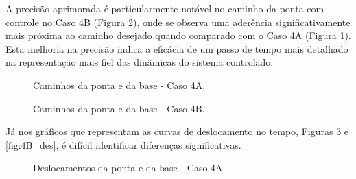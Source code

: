 A precisão aprimorada é particularmente notável no caminho da ponta com controle no Caso 4B (Figura \ref{fig:4B_cam}), onde se observa uma aderência significativamente mais próxima ao caminho desejado quando comparado com o Caso 4A (Figura \ref{fig:4A_cam}). Esta melhoria na precisão indica a eficácia de um passo de tempo mais detalhado na representação mais fiel das dinâmicas do sistema controlado.

\begin{figure}[H]
    \centering
    \hfill
    \hfill
    \hfill
    \caption{Caminhos da ponta e da base - Caso 4A.}
    \label{fig:4A_cam}
\end{figure}

\begin{figure}[H]
    \centering
    \hfill
    \hfill
    \hfill
    \caption{Caminhos da ponta e da base - Caso 4B.}
    \label{fig:4B_cam}
\end{figure}

Já nos gráficos que representam as curvas de deslocamento no tempo, Figuras \ref{fig:4A_des} e \ref{fig:4B_des}, é difícil identificar diferenças significativas.

\begin{figure}[H]
    \centering
    \hfill
    \caption{Deslocamentos da ponta e da base - Caso 4A.}
    \label{fig:4A_des}
\end{figure}

